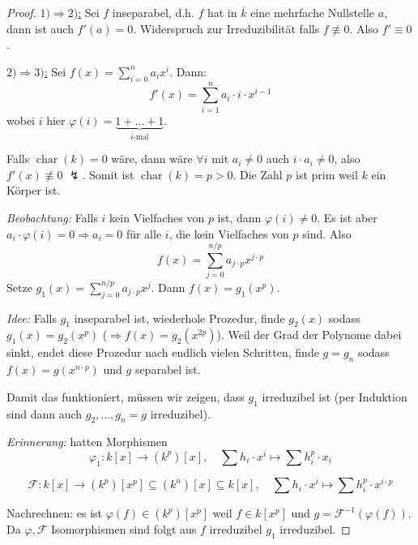 \documentclass[a4paper,12pt,numbers=noenddot,parskip=full]{scrartcl}
\newcommand{\heading}{\underline}
\theoremstyle{dotless}
\theoremstyle{remark}
\begin{document}
	\begin{proof}
		\heading{$1) \Rightarrow 2)$:} Sei $f$ inseparabel, d.h. $f$ hat in $\overline{k}$ eine mehrfache Nullstelle $a$, dann ist auch $f'(a) = 0$. Widerspruch zur Irreduzibilität falls $f \not\equiv 0$. Also $f' \equiv 0$.
		
		\heading{$2) \Rightarrow 3)$:} Sei $f(x) = \sum_{i=0}^n a_i x^i$. Dann:
		\begin{equation*}
			f'(x) = \sum_{i = 1}^n a_i \cdot i \cdot x^{i-1}
		\end{equation*}
		wobei $i$ hier $\varphi(i) = \underbrace{1 + \dots + 1}_\text{$i$-mal}$.
		
		Falls $\operatorname{char}(k) = 0$ wäre, dann wäre $\forall i$ mit $a_i \neq 0$ auch $i \cdot a_i \neq 0$, also $f'(x) \not\equiv 0$ $\lightning$. Somit ist $\operatorname{char}(k) = p > 0$. Die Zahl $p$ ist prim weil $k$ ein Körper ist.
		
		\textit{Beobachtung:} Falls $i$ kein Vielfaches von $p$ ist, dann $\varphi(i) \neq 0$. Es ist aber $a_i \cdot \varphi(i) = 0 \Rightarrow a_i = 0$ für alle $i$, die kein Vielfaches von $p$ sind. Also
		\begin{equation*}
			f(x) = \sum_{j = 0}^{n/p} a_{j \cdot p} x^{j \cdot p}
		\end{equation*}
		Setze $g_1(x) = \sum_{j = 0}^{n/p} a_{j \cdot p} x^j$. Dann $f(x) = g_1(x^p)$.
		
		\textit{Idee:} Falls $g_1$ inseparabel ist, wiederhole Prozedur, finde $g_2(x)$ sodass $g_1(x) = g_2(x^p)$ ($\Rightarrow f(x) = g_2(x^{2p})$). Weil der Grad der Polynome dabei sinkt, endet diese Prozedur nach endlich vielen Schritten, finde $g = g_n$ sodass $f(x) = g(x^{n \cdot p})$ und $g$ separabel ist.
		
		Damit das funktioniert, müssen wir zeigen, dass $g_1$ irreduzibel ist (per Induktion sind dann auch $g_2, \dots, g_n = g$ irreduzibel).
		
		\textit{Erinnerung:} hatten Morphismen
		\begin{equation*}
			\varphi_1: k[x] \to (k^p)[x], \quad \sum h_i \cdot x^i \mapsto \sum h_i^p \cdot x_i
		\end{equation*}
		
		\begin{equation*}
			\mathcal{F}: k[x] \to (k^p)[x^p] \subseteq (k^n)[x] \subseteq k[x], \quad \sum h_i \cdot x^i \mapsto \sum h_i^p \cdot x^{i \cdot p}
		\end{equation*}
		
		Nachrechnen: es ist $\varphi(f) \in (k^p)[x^p]$ weil $f \in k[x^p]$ und $g = \mathcal{F}^{-1}(\varphi(f))$. Da $\varphi, \mathcal{F}$ Isomorphismen sind folgt aus $f$ irreduzibel $g_1$ irreduzibel.
		

\end{proof}
\end{document}
